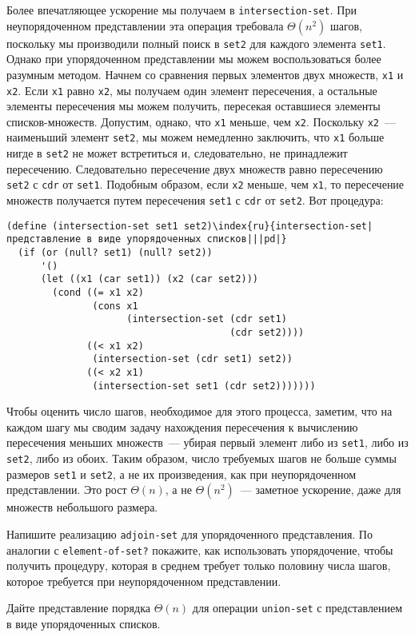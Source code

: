 Более впечатляющее ускорение мы получаем в
{\tt intersection-set}.  При неупорядоченном представлении эта
операция требовала $\Theta (n^2)$ шагов, поскольку мы
производили полный поиск  в {\tt set2} для каждого элемента
{\tt set1}.  Однако при упорядоченном представлении мы можем
воспользоваться более разумным методом.  Начнем со сравнения первых
элементов двух множеств, {\tt x1} и {\tt x2}.  Если
{\tt x1} равно {\tt x2}, мы получаем один элемент
пересечения, а остальные элементы пересечения мы можем получить,
пересекая оставшиеся элементы списков-множеств.  Допустим, однако, что 
{\tt x1} меньше, чем {\tt x2}.  Поскольку
{\tt x2}~--- наименьший элемент {\tt set2}, мы можем
немедленно заключить, что {\tt x1} больше нигде в
{\tt set2} не может встретиться и, следовательно, не
принадлежит пересечению.  Следовательно пересечение двух множеств
равно пересечению {\tt set2} с {\tt cdr} от
{\tt set1}.  Подобным образом, если {\tt x2} меньше, чем
{\tt x1}, то пересечение множеств получается путем пересечения
{\tt set1} с {\tt cdr} от {\tt set2}.  Вот
процедура: 

\begin{Verbatim}[fontsize=\small]
(define (intersection-set set1 set2)\index{ru}{intersection-set|представление в виде упорядоченных списков|||pd|}
  (if (or (null? set1) (null? set2))
      '()
      (let ((x1 (car set1)) (x2 (car set2)))
        (cond ((= x1 x2)
               (cons x1
                     (intersection-set (cdr set1)
                                       (cdr set2))))
              ((< x1 x2)
               (intersection-set (cdr set1) set2))
              ((< x2 x1)
               (intersection-set set1 (cdr set2)))))))
\end{Verbatim}
Чтобы оценить число шагов, необходимое для этого процесса, заметим, 
что на каждом шагу мы сводим задачу нахождения пересечения к вычислению
пересечения меньших множеств~--- убирая первый элемент либо из
{\tt set1}, либо из {\tt set2}, либо из обоих.  Таким
образом, число требуемых шагов не больше суммы размеров
{\tt set1} и {\tt set2}, а не их произведения, как при
неупорядоченном представлении.  Это рост $\Theta (n)$, а не 
$\Theta (n^2)$~--- заметное ускорение, даже для множеств
небольшого размера.
\begin{exercise}{2.61}\label{EX2.61}%
Напишите реализацию {\tt adjoin-set} для
упорядоченного представления. По аналогии с
{\tt element-of-set?} покажите, как использовать упорядочение,
чтобы получить процедуру, которая в среднем требует только половину
 числа шагов, которое требуется при неупорядоченном
представлении.
\end{exercise}
\begin{exercise}{2.62}\label{EX2.62}%
Дайте представление порядка $\Theta (n)$ для
операции 
{\tt union-set} с представлением в виде упорядоченных
списков.
\end{exercise}

